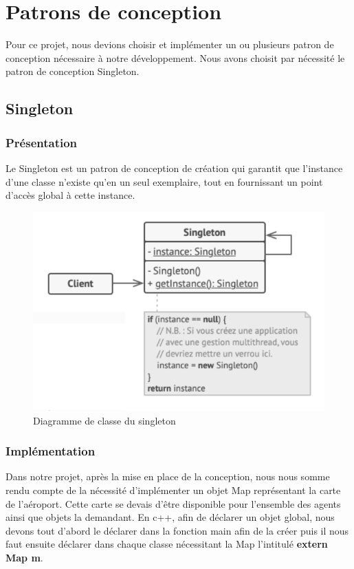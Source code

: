 \documentclass[12pt,french]{article} %
\begin{document}
\section{Patrons de conception}

Pour ce projet, nous devions choisir et implémenter un ou plusieurs patron de conception nécessaire à notre développement. Nous avons choisit par nécessité le patron de conception Singleton.

\subsection{Singleton}

\subsubsection{Présentation}

Le Singleton est un patron de conception de création qui garantit que l’instance d’une classe n’existe qu’en un seul exemplaire, tout en fournissant un point d’accès global à cette instance.

\begin{figure}[H]
	\centering
	\includegraphics[scale=0.5]{single.png}
	\caption{Diagramme de classe du singleton}    
\end{figure}

\subsubsection{Implémentation}

Dans notre projet, après la mise en place de la conception, nous nous somme rendu compte de la nécessité d'implémenter un objet Map représentant la carte de l'aéroport. Cette carte se devais d'être disponible pour l'ensemble des agents ainsi que objets la demandant. En c++, afin de déclarer un objet global, nous devons tout d'abord le déclarer dans la fonction main afin de la créer puis il nous faut ensuite déclarer dans chaque classe nécessitant la Map l'intitulé \textbf{extern Map m}.
\end{document}
